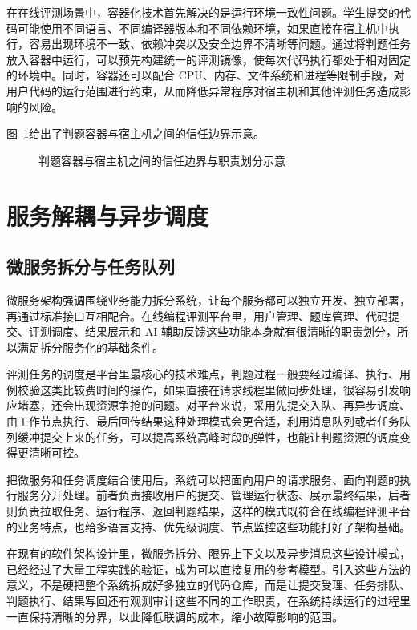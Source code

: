 在在线评测场景中，容器化技术首先解决的是运行环境一致性问题。学生提交的代码可能使用不同语言、不同编译器版本和不同依赖环境，如果直接在宿主机中执行，容易出现环境不一致、依赖冲突以及安全边界不清晰等问题。通过将判题任务放入容器中运行，可以预先构建统一的评测镜像，使每次代码执行都处于相对固定的环境中。同时，容器还可以配合 CPU、内存、文件系统和进程等限制手段，对用户代码的运行范围进行约束，从而降低异常程序对宿主机和其他评测任务造成影响的风险。

图~\ref{fig:ch2-container-boundary}给出了判题容器与宿主机之间的信任边界示意。

\begin{figure}[htbp]
  \centering
  \resizebox{0.92\textwidth}{!}{}
  \caption{判题容器与宿主机之间的信任边界与职责划分示意}
  \label{fig:ch2-container-boundary}
\end{figure}

\section{服务解耦与异步调度}

\subsection{微服务拆分与任务队列}

微服务架构强调围绕业务能力拆分系统，让每个服务都可以独立开发、独立部署，再通过标准接口互相配合。在线编程评测平台里，用户管理、题库管理、代码提交、评测调度、结果展示和 AI 辅助反馈这些功能本身就有很清晰的职责划分，所以满足拆分服务化的基础条件\cite{balalaie2016microservices,difrancesco2019microservices}。

评测任务的调度是平台里最核心的技术难点，判题过程一般要经过编译、执行、用例校验这类比较费时间的操作，如果直接在请求线程里做同步处理，很容易引发响应堵塞，还会出现资源争抢的问题。对平台来说，采用先提交入队、再异步调度、由工作节点执行、最后回传结果这种处理模式会更合适，利用消息队列或者任务队列缓冲提交上来的任务，可以提高系统高峰时段的弹性，也能让判题资源的调度变得更清晰可控。

把微服务和任务调度结合使用后，系统可以把面向用户的请求服务、面向判题的执行服务分开处理。前者负责接收用户的提交、管理运行状态、展示最终结果，后者则负责拉取任务、运行程序、返回判题结果，这样的模式既符合在线编程评测平台的业务特点，也给多语言支持、优先级调度、节点监控这些功能打好了架构基础。

在现有的软件架构设计里，微服务拆分、限界上下文以及异步消息这些设计模式，已经经过了大量工程实践的验证，成为可以直接复用的参考模型\cite{richardson2018microservices,newman2021buildingmicroservices,fowler2014microservices,difrancesco2019microservices}。引入这些方法的意义，不是硬把整个系统拆成好多独立的代码仓库，而是让提交受理、任务排队、判题执行、结果写回还有观测审计这些不同的工作职责，在系统持续运行的过程里一直保持清晰的分界，以此降低联调的成本，缩小故障影响的范围\cite{balalaie2016microservices}。

